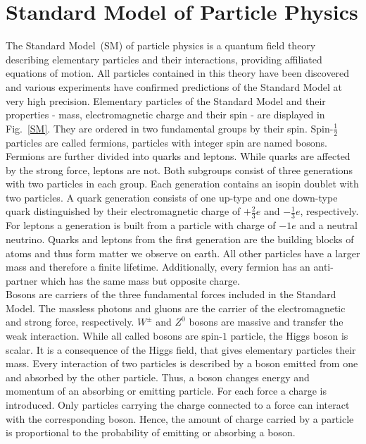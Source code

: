 \section{Standard Model of Particle Physics}
	The Standard Model~(SM) of particle physics is a quantum field theory describing elementary particles and their interactions, providing affiliated equations of motion. All particles contained in this theory have been discovered and various experiments have confirmed predictions of the Standard Model at very high precision. Elementary particles of the Standard Model and their properties - mass, electromagnetic charge and their spin - are displayed in Fig.~\ref{SM}. They are ordered in two fundamental groups by their spin. Spin-$\frac{1}{2}$ particles are called fermions, particles with integer spin are named bosons. 
	\\
	Fermions are further divided into quarks and leptons. While quarks are affected by the strong force, leptons are not. Both subgroups consist of three generations with two particles in each group. Each generation contains an isopin doublet with two particles. A quark generation consists of one up-type and one down-type quark distinguished by their electromagnetic charge of $+\frac{2}{3}e$ and $-\frac{1}{3}e$, respectively. For leptons a generation is built from a particle with charge of $-1e$ and a neutral neutrino. Quarks and leptons from the first generation are the building blocks of atoms and thus form matter we observe on earth. All other particles have a larger mass and therefore a finite lifetime. Additionally, every fermion has an anti-partner which has the same mass but opposite charge. 
	\\	
	Bosons are carriers of the three fundamental forces included in the Standard Model. The massless photons and gluons are the carrier of the electromagnetic and strong force, respectively. $W^\pm$ and $Z^0$ bosons are massive and transfer the weak interaction. While all called bosons are spin-$1$ particle, the Higgs boson is scalar. It is a consequence of the Higgs field, that gives elementary particles their mass. Every interaction of two particles is described by a boson emitted from one and absorbed by the other particle. Thus, a boson changes energy and momentum of an absorbing or emitting particle. For each force a charge is introduced. Only particles carrying the charge connected to a force can interact with the corresponding boson. Hence, the amount of charge carried by a particle is proportional to the probability of emitting or absorbing a boson. 
	\\
